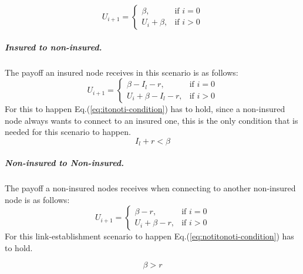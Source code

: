 \begin{equation}
    U_{i+1}= 
\begin{cases}
    \beta,& \text{if } i = 0\\
    U_{i}+\beta,& \text{if }  i>0
   
\end{cases}
\label{eq:noti-to-i-model2}
\end{equation}
\subparagraph{Insured to non-insured.}
The payoff an insured node receives in this scenario is as follows:
\begin{equation}
    U_{i+1}= 
\begin{cases}
    \beta - I_{l}-r,& \text{if } i = 0\\
    U_{i}+\beta -I_{l}-r,& \text{if }  i>0
   
\end{cases}
\label{eq:itonotimodel2}
\end{equation}
For this to happen Eq.(\ref{eq:itonoti-condition}) has to hold, since a non-insured node always wants to connect to an insured one, this is the only condition that is needed for this scenario to happen.
\begin{equation}
I_{l}+r<\beta
\label{eq:itonoti-condition}
\end{equation}
\subparagraph{Non-insured to Non-insured.}
The payoff a non-insured nodes receives when connecting to another non-insured node is as follows:
\begin{equation}
    U_{i+1}= 
\begin{cases}
    \beta -r,& \text{if } i = 0\\
    U_{i}+\beta -r,& \text{if }  i>0
   
\end{cases}
\label{eq:notitonotimodel2}
\end{equation}
For this link-establishment scenario to happen Eq.(\ref{eq:notitonoti-condition}) has to hold.

\begin{equation}
\beta>r
\label{eq:notitonoti-condition}
\end{equation}

